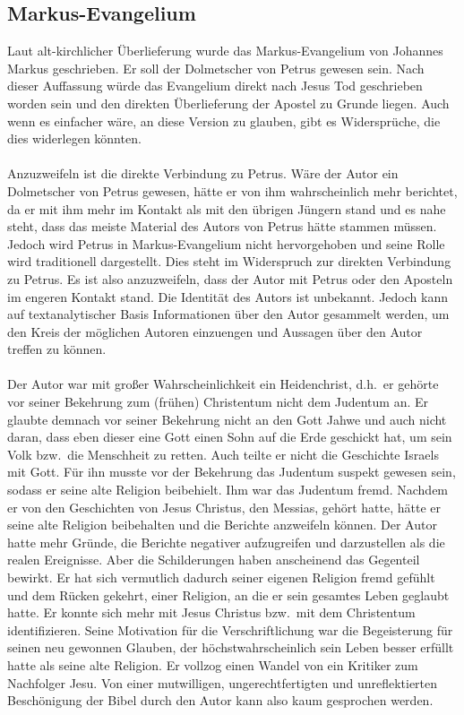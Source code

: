 \subsection*{Markus-Evangelium}
Laut alt-kirchlicher Überlieferung wurde das Markus-Evangelium von Johannes Markus geschrieben. Er soll der Dolmetscher von Petrus gewesen sein. Nach dieser Auffassung würde das Evangelium direkt nach Jesus Tod geschrieben worden sein und den direkten Überlieferung der Apostel zu Grunde liegen. Auch wenn es einfacher wäre, an diese Version zu glauben, gibt es Widersprüche, die dies widerlegen könnten.
\\~\\
Anzuzweifeln ist die direkte Verbindung zu Petrus. Wäre der Autor ein Dolmetscher von Petrus gewesen, hätte er von ihm wahrscheinlich mehr berichtet, da er mit ihm mehr im Kontakt als mit den übrigen Jüngern stand und es nahe steht, dass das meiste Material des Autors von Petrus hätte stammen müssen. Jedoch wird Petrus in Markus-Evangelium nicht hervorgehoben und seine Rolle wird traditionell dargestellt. Dies steht im Widerspruch zur direkten Verbindung zu Petrus. Es ist also anzuzweifeln, dass der Autor mit Petrus oder den Aposteln im engeren Kontakt stand. Die Identität des Autors ist unbekannt. Jedoch kann auf textanalytischer Basis Informationen über den Autor gesammelt werden, um den Kreis der möglichen Autoren einzuengen und Aussagen über den Autor treffen zu können.
\\~\\
Der Autor war mit großer Wahrscheinlichkeit ein Heidenchrist, d.h.\ er gehörte vor seiner Bekehrung zum (frühen) Christentum nicht dem Judentum an. Er glaubte demnach vor seiner Bekehrung nicht an den Gott Jahwe und auch nicht daran, dass eben dieser eine Gott einen Sohn auf die Erde geschickt hat, um sein Volk bzw.\ die Menschheit zu retten. Auch teilte er nicht die Geschichte Israels mit Gott. Für ihn musste vor der Bekehrung das Judentum suspekt gewesen sein, sodass er seine alte Religion beibehielt. Ihm war das Judentum fremd. Nachdem er von den Geschichten von Jesus Christus, den Messias, gehört hatte, hätte er seine alte Religion beibehalten und die Berichte anzweifeln können. Der Autor hatte mehr Gründe, die Berichte negativer aufzugreifen und darzustellen als die realen Ereignisse. Aber die Schilderungen haben anscheinend das Gegenteil bewirkt. Er hat sich vermutlich dadurch seiner eigenen Religion fremd gefühlt und dem Rücken gekehrt, einer Religion, an die er sein gesamtes Leben geglaubt hatte. Er konnte sich mehr mit Jesus Christus bzw.\ mit dem Christentum identifizieren. Seine Motivation für die Verschriftlichung war die Begeisterung für seinen neu gewonnen Glauben, der höchstwahrscheinlich sein Leben besser erfüllt hatte als seine alte Religion. Er vollzog einen Wandel von ein Kritiker zum Nachfolger Jesu. Von einer mutwilligen, ungerechtfertigten und unreflektierten Beschönigung der Bibel durch den Autor kann also kaum gesprochen werden.
